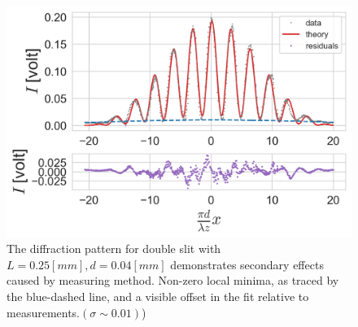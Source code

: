 \begin{figure}[H]
    \includegraphics[width=0.9\columnwidth]{figures/0.04w0.25s memory.png}
    \caption{The diffraction pattern for double slit with $L=0.25[mm],d=0.04[mm]$ demonstrates secondary effects caused by measuring method. Non-zero local minima, as traced by the blue-dashed line, and a visible offset in the fit relative to measurements.$(\sigma\sim0.01)$)}
    \label{fig:0.04w0.25s_memory}
\end{figure}